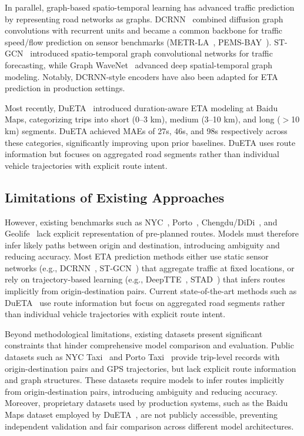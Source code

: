In parallel, graph-based spatio-temporal learning has advanced traffic prediction by representing road networks as graphs. DCRNN~\cite{dcrnn2018} combined diffusion graph convolutions with recurrent units and became a common backbone for traffic speed/flow prediction on sensor benchmarks (METR-LA~\cite{li2018_metrla}, PEMS-BAY~\cite{pemsbay}). ST-GCN~\cite{yu2018stgcn} introduced spatio-temporal graph convolutional networks for traffic forecasting, while Graph WaveNet~\cite{wu2019graphwavenet} advanced deep spatial-temporal graph modeling. Notably, DCRNN-style encoders have also been adapted for ETA prediction in production settings.

Most recently, DuETA~\cite{dueta2023} introduced duration-aware ETA modeling at Baidu Maps, categorizing trips into short (0--3 km), medium (3--10 km), and long ($>$10 km) segments. DuETA achieved MAEs of 27s, 46s, and 98s respectively across these categories, significantly improving upon prior baselines. DuETA uses route information but focuses on aggregated road segments rather than individual vehicle trajectories with explicit route intent.

\subsection{Limitations of Existing Approaches}

However, existing benchmarks such as NYC~\cite{nyc_tlc}, Porto~\cite{moreira2013porto}, Chengdu/DiDi~\cite{didi2016}, and Geolife~\cite{zheng2012geolife} lack explicit representation of pre-planned routes. Models must therefore infer likely paths between origin and destination, introducing ambiguity and reducing accuracy. Most ETA prediction methods either use static sensor networks (e.g., DCRNN~\cite{dcrnn2018}, ST-GCN~\cite{yu2018stgcn}) that aggregate traffic at fixed locations, or rely on trajectory-based learning (e.g., DeepTTE~\cite{deepTTE2018}, STAD~\cite{abbar2020stad}) that infers routes implicitly from origin-destination pairs. Current state-of-the-art methods such as DuETA~\cite{dueta2023} use route information but focus on aggregated road segments rather than individual vehicle trajectories with explicit route intent.

Beyond methodological limitations, existing datasets present significant constraints that hinder comprehensive model comparison and evaluation. Public datasets such as NYC Taxi~\cite{nyc_tlc} and Porto Taxi~\cite{moreira2013porto} provide trip-level records with origin-destination pairs and GPS trajectories, but lack explicit route information and graph structures. These datasets require models to infer routes implicitly from origin-destination pairs, introducing ambiguity and reducing accuracy. Moreover, proprietary datasets used by production systems, such as the Baidu Maps dataset employed by DuETA~\cite{dueta2023}, are not publicly accessible, preventing independent validation and fair comparison across different model architectures.

